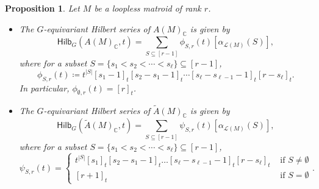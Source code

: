 \documentclass[10pt,a4paper]{amsart}
\newtheorem{prop}{Proposition}
\newcommand{\Hilb}{{\mathsf{Hilb}}}
\renewcommand{\L}{{\mathcal{L}}}
\begin{document}
\begin{prop} \label{prop:HilbChow}
Let $M$ be a loopless matroid of rank $r$.
\begin{itemize} 
    \item[(i)] The $G$-equivariant Hilbert series of $A(M)_{\mathbb{C}}$ is given by
    \[
        \Hilb_G(A(M)_{\mathbb{C}},t)=\sum_{S\subseteq [r-1]}\phi_{S,r}(t)[\alpha_{\L(M)}(S)],
    \]
    where for a subset $S=\{s_1<s_2<\cdots<s_{\ell}\}\subseteq [r-1]$,
    \[
        \phi_{S,r}(t)\coloneqq t^{|S|}[s_1-1]_t[s_2-s_1-1]_t\cdots[s_{\ell}-s_{\ell-1}-1]_t[r-s_{\ell}]_t.
    \]
    In particular, $\phi_{\emptyset,r}(t)=[r]_t$.
    \item[(ii)] The $G$-equivariant Hilbert series of $\widetilde{A}(M)_{\mathbb{C}}$ is given by
    \[
    \Hilb_G(\widetilde{A}(M)_{\mathbb{C}},t)=\sum_{S\subseteq[r-1]}\psi_{S,r}(t)[\alpha_{\L(M)}(S)],
    \]
    where for a subset $S=\{s_1<s_2<\cdots<s_{\ell}\}\subseteq [r-1]$,
    \[
    \psi_{S,r}(t)=\begin{cases}
        t^{|S|}[s_1]_t[s_2-s_1-1]_t\ldots[s_{\ell}-s_{\ell-1}-1]_t[r-s_{\ell}]_t & \text{ if }S\neq \emptyset\\
        [r+1]_t & \text{ if } S=\emptyset
    \end{cases}.
    \]
\end{itemize}


\end{prop}
\end{document}
